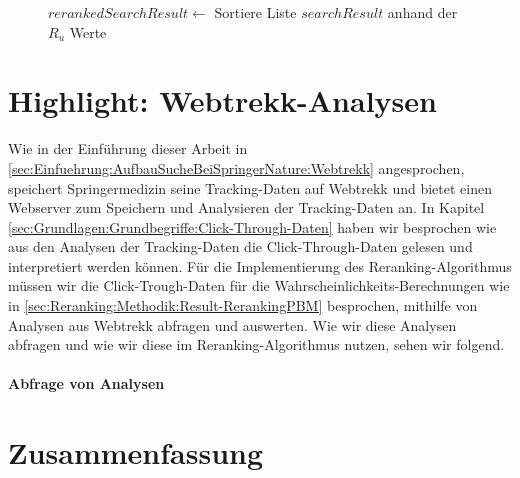 \begin{figure}[H]
\begin{algorithm}[H]
{{{			\BlankLine
			$rerankedSearchResult \leftarrow$ Sortiere Liste $searchResult$ anhand der $R_{u}$ Werte\;
		}{	
		}
	}{
	}
}
\end{algorithm}
\end{figure}

\section{Highlight: Webtrekk-Analysen}
\label{sec:Implementierung:Webtrekk}

Wie in der Einführung dieser Arbeit in \ref{sec:Einfuehrung:AufbauSucheBeiSpringerNature:Webtrekk} angesprochen, speichert Springermedizin seine Tracking-Daten auf Webtrekk und bietet einen Webserver zum Speichern und Analysieren der Tracking-Daten an. In Kapitel \ref{sec:Grundlagen:Grundbegriffe:Click-Through-Daten} haben wir besprochen wie aus den Analysen der Tracking-Daten die Click-Through-Daten gelesen und interpretiert werden können. Für die Implementierung des Reranking-Algorithmus müssen wir die Click-Trough-Daten für die Wahrscheinlichkeits-Berechnungen wie in \ref{sec:Reranking:Methodik:Result-RerankingPBM} besprochen, mithilfe von Analysen aus Webtrekk abfragen und auswerten. Wie wir diese Analysen abfragen und wie wir diese im Reranking-Algorithmus nutzen, sehen wir folgend.

\paragraph{Abfrage von Analysen}



\section{Zusammenfassung}
\label{sec:Implementierung:Zusammenfassung}